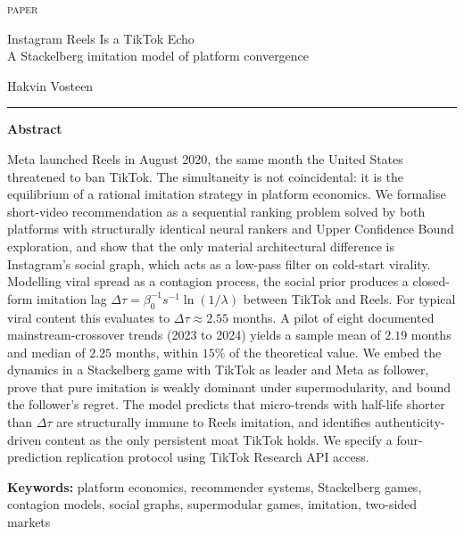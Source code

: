 \documentclass[12pt,a4paper]{article}
\begin{document}
{\small\scshape paper}

\vspace{0.8cm}

{\LARGE Instagram Reels Is a TikTok Echo\\[4pt]
\normalsize A Stackelberg imitation model of platform convergence}

\vspace{0.7cm}

Hakvin Vosteen

\vspace{0.6cm}

\noindent\rule{\textwidth}{0.4pt}

\textbf{Abstract}

\vspace{0.2em}

Meta launched Reels in August 2020, the same month the United States threatened to ban TikTok. The simultaneity is not coincidental: it is the equilibrium of a rational imitation strategy in platform economics. We formalise short-video recommendation as a sequential ranking problem solved by both platforms with structurally identical neural rankers and Upper Confidence Bound exploration, and show that the only material architectural difference is Instagram's social graph, which acts as a low-pass filter on cold-start virality. Modelling viral spread as a contagion process, the social prior produces a closed-form imitation lag $\Delta\tau = \beta_0^{-1} s^{-1} \ln(1/\lambda)$ between TikTok and Reels. For typical viral content this evaluates to $\Delta\tau \approx 2.55$ months. A pilot of eight documented mainstream-crossover trends (2023 to 2024) yields a sample mean of $2.19$ months and median of $2.25$ months, within $15\%$ of the theoretical value. We embed the dynamics in a Stackelberg game with TikTok as leader and Meta as follower, prove that pure imitation is weakly dominant under supermodularity, and bound the follower's regret. The model predicts that micro-trends with half-life shorter than $\Delta\tau$ are structurally immune to Reels imitation, and identifies authenticity-driven content as the only persistent moat TikTok holds. We specify a four-prediction replication protocol using TikTok Research API access.

\vspace{0.4em}

{\small\textbf{Keywords:} platform economics, recommender systems, Stackelberg games, contagion models, social graphs, supermodular games, imitation, two-sided markets}
\end{document}
